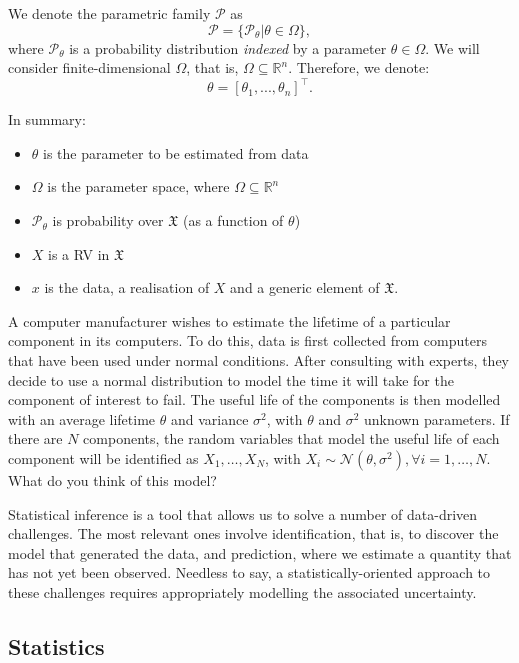 We denote the parametric family $\mathcal{P}$ as
\[\mathcal{P} = \{\mathcal{P}_\theta | \theta \in \Omega \},\]
where $\mathcal{P}_\theta $ is a probability distribution \emph{indexed} by a parameter $\theta \in \Omega$. We will consider finite-dimensional $\Omega$, that is, $\Omega \subseteq \mathbb{R}^n$. Therefore, we denote:
\[\theta = [\theta_1, ..., \theta_n]^\top. \]

In summary:

\begin{itemize}
    \item $\theta$ is the parameter to be estimated from data
    \item $\Omega$ is the parameter space, where $\Omega \subseteq \mathbb{R}^n$
    \item $\mathcal{P}_\theta$ is probability over  $\mathfrak{X}$ (as a function of $\theta$)
    \item ${X}$ is a RV in $\mathfrak{X}$
    \item $x$ is the data, a realisation of $X$ and a generic element of $\mathfrak{X}$.
\end{itemize}
\begin{example}
A computer manufacturer wishes to estimate the lifetime of a particular component in its computers. To do this, data is first collected from computers that have been used under normal conditions. After consulting with experts, they decide to use a normal distribution to model the time it will take for the component of interest to fail. The useful life of the components is then modelled with an average lifetime $\theta$ and variance $\sigma^2$, with $\theta$ and $\sigma^{2}$  unknown parameters. If there are $N$ components, the random variables that model the useful life of each component will be identified as 
$X_1,\ldots,X_N$, with $X_i \sim \mathcal{N}(\theta,\sigma^{2}), \forall i=1,\ldots,N$. What do you think of this model?
\end{example}

Statistical inference is a tool that allows us to solve a number of data-driven challenges. The most relevant ones involve identification, that is, to discover the model that generated the data, and prediction, where we estimate a quantity that has not yet been observed. Needless to say, a statistically-oriented approach to these challenges requires appropriately modelling the associated uncertainty.

\subsection{Statistics}

